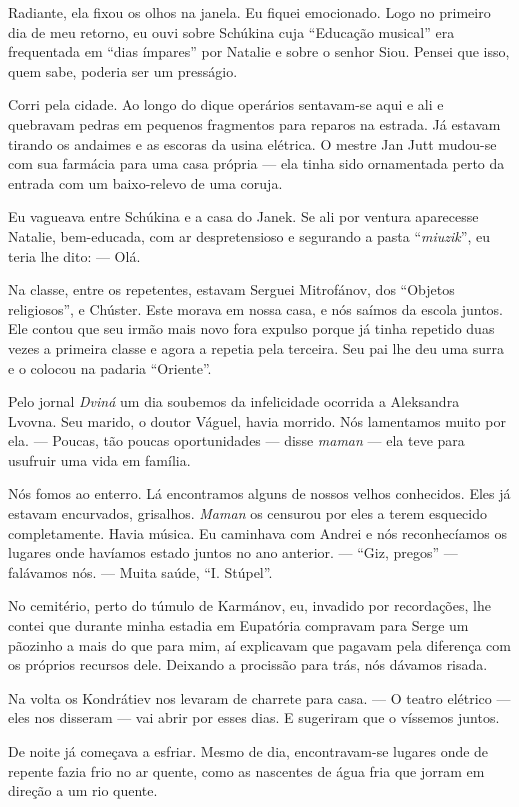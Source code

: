 Radiante, ela fixou os olhos na janela. Eu fiquei emocionado. Logo no
primeiro dia de meu retorno, eu ouvi sobre Schúkina cuja ``Educação
musical'' era frequentada em ``dias ímpares'' por Natalie e sobre o
senhor Siou. Pensei que isso, quem sabe, poderia ser um presságio.

Corri pela cidade. Ao longo do dique operários sentavam-se aqui e ali e
quebravam pedras em pequenos fragmentos para reparos na estrada. Já
estavam tirando os andaimes e as escoras da usina elétrica. O mestre Jan
Jutt mudou-se com sua farmácia para uma casa própria --- ela tinha sido
ornamentada perto da entrada com um baixo-relevo de uma coruja.

Eu vagueava entre Schúkina e a casa do Janek. Se ali por ventura
aparecesse Natalie, bem-educada, com ar despretensioso e segurando a
pasta ``\emph{miuzik}'', eu teria lhe dito: --- Olá.

Na classe, entre os repetentes, estavam Serguei Mitrofánov, dos
``Objetos religiosos'', e Chúster. Este morava em nossa casa, e nós
saímos da escola juntos. Ele contou que seu irmão mais novo fora expulso
porque já tinha repetido duas vezes a primeira classe e agora a repetia
pela terceira. Seu pai lhe deu uma surra e o colocou na padaria
``Oriente''.

Pelo jornal \emph{Dviná} um dia soubemos da infelicidade ocorrida a
Aleksandra Lvovna. Seu marido, o doutor Váguel, havia morrido. Nós
lamentamos muito por ela. --- Poucas, tão poucas oportunidades --- disse
\emph{maman} --- ela teve para usufruir uma vida em família.

Nós fomos ao enterro. Lá encontramos alguns de nossos velhos conhecidos.
Eles já estavam encurvados, grisalhos. \emph{Maman} os censurou por eles
a terem esquecido completamente. Havia música. Eu caminhava com Andrei e
nós reconhecíamos os lugares onde havíamos estado juntos no ano
anterior. --- ``Giz, pregos'' --- falávamos nós. --- Muita saúde, ``I.
Stúpel''.

No cemitério, perto do túmulo de Karmánov, eu, invadido por recordações,
lhe contei que durante minha estadia em Eupatória compravam para Serge
um pãozinho a mais do que para mim, aí explicavam que pagavam pela
diferença com os próprios recursos dele. Deixando a procissão para trás,
nós dávamos risada.

Na volta os Kondrátiev nos levaram de charrete para casa. --- O teatro
elétrico --- eles nos disseram --- vai abrir por esses dias. E sugeriram
que o víssemos juntos.

De noite já começava a esfriar. Mesmo de dia, encontravam-se lugares
onde de repente fazia frio no ar quente, como as nascentes de água fria
que jorram em direção a um rio quente.


